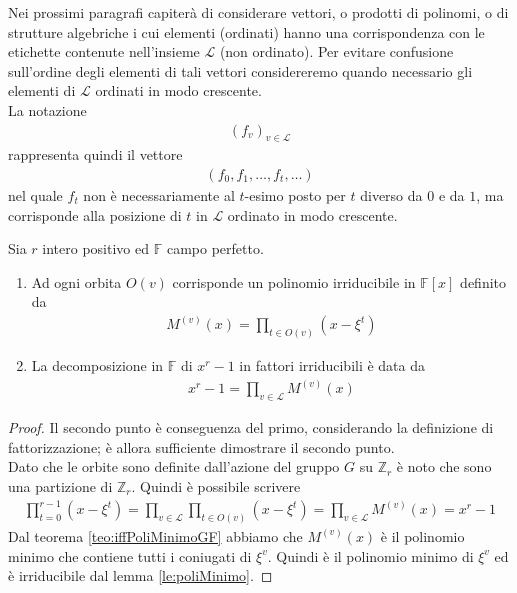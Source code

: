 Nei prossimi paragrafi capiterà di considerare vettori, o prodotti di polinomi, o di strutture algebriche i cui elementi (ordinati) hanno una corrispondenza con le etichette contenute nell'insieme $\mathscr{L}$ (non ordinato). Per evitare confusione sull'ordine degli elementi di tali vettori considereremo quando necessario gli elementi di $\mathscr{L}$ ordinati in modo crescente.\\
La notazione
\begin{align*}
   (f_{v})_{v \in \mathscr{L}}
\end{align*}
rappresenta quindi il vettore
\begin{align*}
   (f_{0},f_{1}, \dots , f_{t}, \dots)
\end{align*}
nel quale $f_{t}$ non è necessariamente al $t$-esimo posto per $t$ diverso da $0$ e da $1$, ma corrisponde alla posizione di $t$ in $\mathscr{L}$ ordinato in modo crescente.

\begin{teorema}
   Sia $r$ intero positivo ed $\mathbb{F}$ campo perfetto. 
   \begin{enumerate}
      \item Ad ogni orbita $O(v)$ corrisponde un polinomio irriducibile in $\mathbb{F}[x]$ definito da 
            \begin{align*}
               M^{(v)}(x) =  \prod_{t \in O(v)} (x- \xi^t)
            \end{align*}
      \item La decomposizione in $\mathbb{F}$ di $x^r - 1$ in fattori irriducibili è data da 
            \begin{align*}
               x^r - 1 = \prod_{v \in \mathscr{L} } M^{(v)}(x)
            \end{align*}
   \end{enumerate}
\end{teorema}
\begin{proof}
Il secondo punto è conseguenza del primo, considerando la definizione di fattorizzazione; è allora sufficiente dimostrare il secondo punto.\\
Dato che le orbite sono definite dall'azione del gruppo $G$ su $\mathbb{Z}_{r}$ è noto che sono una partizione di $\mathbb{Z}_{r}$.
Quindi è possibile scrivere
\begin{align*}
   \prod_{t= 0}^{r-1} (x - \xi^{t})  
   = \prod_{v \in \mathscr{L} } \prod_{t \in O(v)} (x - \xi^{t}) 
   = \prod_{v \in \mathscr{L} } M^{(v)}(x)
   =  x^r - 1
\end{align*}
Dal teorema \ref{teo:iffPoliMinimoGF} abbiamo che $M^{(v)}(x)$ è il polinomio minimo che contiene tutti i coniugati di $\xi^{v}$. Quindi è il polinomio minimo di $\xi^{v}$ ed è irriducibile dal lemma \ref{le:poliMinimo}. 
\end{proof}

